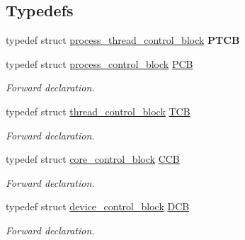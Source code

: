 \subsection*{Typedefs}
\begin{DoxyCompactItemize}
\item 
\mbox{\label{group__rlists_ga2115e4c199a702aaf36f4571877bf013}} 
typedef struct \hyperlink{structprocess__thread__control__block}{process\+\_\+thread\+\_\+control\+\_\+block} {\bfseries P\+T\+CB}
\item 
\mbox{\label{group__rlists_ga91aaadf0c3f9cef2293a99c69795323f}} 
typedef struct \hyperlink{structprocess__control__block}{process\+\_\+control\+\_\+block} \hyperlink{group__rlists_ga91aaadf0c3f9cef2293a99c69795323f}{P\+CB}
\begin{DoxyCompactList}\small\item\em Forward declaration. \end{DoxyCompactList}\item 
\mbox{\label{group__rlists_ga8e5eca0c5ec064a81ae9246c7d4f32ef}} 
typedef struct \hyperlink{structthread__control__block}{thread\+\_\+control\+\_\+block} \hyperlink{group__rlists_ga8e5eca0c5ec064a81ae9246c7d4f32ef}{T\+CB}
\begin{DoxyCompactList}\small\item\em Forward declaration. \end{DoxyCompactList}\item 
\mbox{\label{group__rlists_gac3d551eb0caa1296280ea2278b4f1b11}} 
typedef struct \hyperlink{structcore__control__block}{core\+\_\+control\+\_\+block} \hyperlink{group__rlists_gac3d551eb0caa1296280ea2278b4f1b11}{C\+CB}
\begin{DoxyCompactList}\small\item\em Forward declaration. \end{DoxyCompactList}\item 
\mbox{\label{group__rlists_ga5b4de7b0c72db6219c5a6dda2466181f}} 
typedef struct \hyperlink{structdevice__control__block}{device\+\_\+control\+\_\+block} \hyperlink{group__rlists_ga5b4de7b0c72db6219c5a6dda2466181f}{D\+CB}
\begin{DoxyCompactList}\small\item\em Forward declaration. \end{DoxyCompactList}\item 

\end{DoxyCompactItemize}
